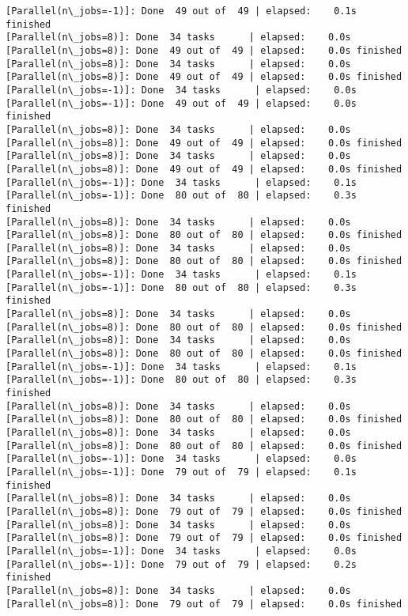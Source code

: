 \documentclass[11pt]{article}
\begin{document}
\begin{Verbatim}[commandchars=\\\{\}]
[Parallel(n\_jobs=-1)]: Done  49 out of  49 | elapsed:    0.1s finished
[Parallel(n\_jobs=8)]: Done  34 tasks      | elapsed:    0.0s
[Parallel(n\_jobs=8)]: Done  49 out of  49 | elapsed:    0.0s finished
[Parallel(n\_jobs=8)]: Done  34 tasks      | elapsed:    0.0s
[Parallel(n\_jobs=8)]: Done  49 out of  49 | elapsed:    0.0s finished
[Parallel(n\_jobs=-1)]: Done  34 tasks      | elapsed:    0.0s
[Parallel(n\_jobs=-1)]: Done  49 out of  49 | elapsed:    0.0s finished
[Parallel(n\_jobs=8)]: Done  34 tasks      | elapsed:    0.0s
[Parallel(n\_jobs=8)]: Done  49 out of  49 | elapsed:    0.0s finished
[Parallel(n\_jobs=8)]: Done  34 tasks      | elapsed:    0.0s
[Parallel(n\_jobs=8)]: Done  49 out of  49 | elapsed:    0.0s finished
[Parallel(n\_jobs=-1)]: Done  34 tasks      | elapsed:    0.1s
[Parallel(n\_jobs=-1)]: Done  80 out of  80 | elapsed:    0.3s finished
[Parallel(n\_jobs=8)]: Done  34 tasks      | elapsed:    0.0s
[Parallel(n\_jobs=8)]: Done  80 out of  80 | elapsed:    0.0s finished
[Parallel(n\_jobs=8)]: Done  34 tasks      | elapsed:    0.0s
[Parallel(n\_jobs=8)]: Done  80 out of  80 | elapsed:    0.0s finished
[Parallel(n\_jobs=-1)]: Done  34 tasks      | elapsed:    0.1s
[Parallel(n\_jobs=-1)]: Done  80 out of  80 | elapsed:    0.3s finished
[Parallel(n\_jobs=8)]: Done  34 tasks      | elapsed:    0.0s
[Parallel(n\_jobs=8)]: Done  80 out of  80 | elapsed:    0.0s finished
[Parallel(n\_jobs=8)]: Done  34 tasks      | elapsed:    0.0s
[Parallel(n\_jobs=8)]: Done  80 out of  80 | elapsed:    0.0s finished
[Parallel(n\_jobs=-1)]: Done  34 tasks      | elapsed:    0.1s
[Parallel(n\_jobs=-1)]: Done  80 out of  80 | elapsed:    0.3s finished
[Parallel(n\_jobs=8)]: Done  34 tasks      | elapsed:    0.0s
[Parallel(n\_jobs=8)]: Done  80 out of  80 | elapsed:    0.0s finished
[Parallel(n\_jobs=8)]: Done  34 tasks      | elapsed:    0.0s
[Parallel(n\_jobs=8)]: Done  80 out of  80 | elapsed:    0.0s finished
[Parallel(n\_jobs=-1)]: Done  34 tasks      | elapsed:    0.0s
[Parallel(n\_jobs=-1)]: Done  79 out of  79 | elapsed:    0.1s finished
[Parallel(n\_jobs=8)]: Done  34 tasks      | elapsed:    0.0s
[Parallel(n\_jobs=8)]: Done  79 out of  79 | elapsed:    0.0s finished
[Parallel(n\_jobs=8)]: Done  34 tasks      | elapsed:    0.0s
[Parallel(n\_jobs=8)]: Done  79 out of  79 | elapsed:    0.0s finished
[Parallel(n\_jobs=-1)]: Done  34 tasks      | elapsed:    0.0s
[Parallel(n\_jobs=-1)]: Done  79 out of  79 | elapsed:    0.2s finished
[Parallel(n\_jobs=8)]: Done  34 tasks      | elapsed:    0.0s
[Parallel(n\_jobs=8)]: Done  79 out of  79 | elapsed:    0.0s finished

\end{Verbatim}
\end{document}
